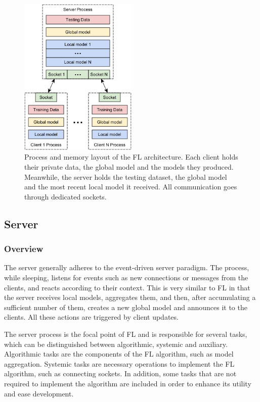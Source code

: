 \begin{figure}[H]
    \centering
        \includegraphics[width=0.5\textwidth]{Images/block_diagrams/memory_layout.png}
        \decoRule
        \caption[Process \& Memory layout]{Process and memory layout of the FL architecture. Each client holds their private data, the global model and the models they produced. Meanwhile, the server holds the testing dataset, the global model and the most recent local model it received. All communication goes through dedicated sockets.}
        \label{fig:process_mem_layout}
\end{figure}

\subsection{Server}
\subsubsection{Overview}
The server generally adheres to the event-driven server paradigm. The process, while sleeping, listens for events such as new connections or messages from the clients, and reacts according to their context. This is very similar to FL in that the server receives local models, aggregates them, and then, after accumulating a sufficient number of them, creates a new global model and announces it to the clients. All these actions are triggered by client updates.

The server process is the focal point of FL and is responsible for several tasks, which can be distinguished between algorithmic, systemic and auxiliary. Algorithmic tasks are the components of the FL algorithm, such as model aggregation. Systemic tasks are necessary operations to implement the FL algorithm, such as connecting sockets. In addition, some tasks that are not required to implement the algorithm are included in order to enhance its utility and ease development.

